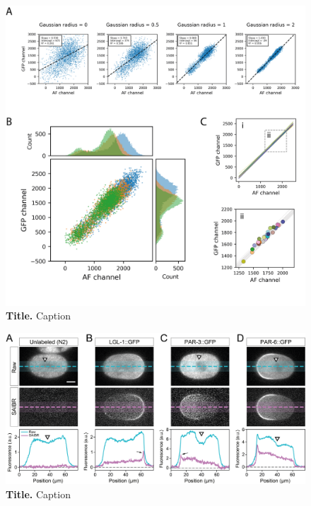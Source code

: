 \documentclass[11pt]{"article"}
\newcommand{\mycaption}[2]{\caption[#1]{\textbf{#1.} #2}}
\begin{document}
\begin{figure}[!h]
\includegraphics[scale=1]{saibr_n2_correlation}
\setlength{\abovecaptionskip}{20pt}
\centering
\mycaption{Title}{Caption}
\end{figure}


\begin{figure}[!h]
\includegraphics[scale=1]{saibr_spatial_correction}
\setlength{\abovecaptionskip}{20pt}
\centering
\mycaption{Title}{Caption}
\end{figure}
\end{document}
